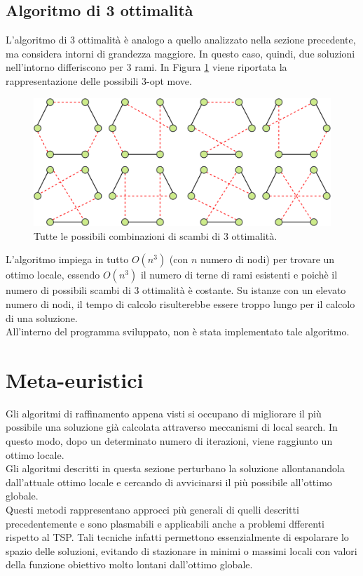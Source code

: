 \subsection{Algoritmo di 3 ottimalità}
L'algoritmo di 3 ottimalità è analogo a quello analizzato nella sezione precedente, ma considera intorni di grandezza maggiore. In questo caso, quindi, due soluzioni nell'intorno differiscono per 3 rami. In Figura \ref{three_optimality} viene riportata la rappresentazione delle possibili 3-opt move.
\begin{figure}[H] 
\begin{center} 
  \includegraphics[scale=0.35]{Images/3_swap}
  \caption{\footnotesize{Tutte le possibili combinazioni di scambi di 3 ottimalità.}}
  \label{three_optimality}
\end{center}
\end{figure}
L'algoritmo impiega in tutto $O(n^3)$ (con $n$ numero di nodi) per trovare un ottimo locale, essendo $O(n^3)$ il numero di terne di rami esistenti e poichè il numero di possibili scambi di 3 ottimalità è costante. Su istanze con un elevato numero di nodi, il tempo di calcolo risulterebbe essere troppo lungo per il calcolo di una soluzione.\\
All'interno del programma sviluppato, non è stata implementato tale algoritmo.

\section{Meta-euristici}
Gli algoritmi di raffinamento appena visti si occupano di migliorare il più possibile una soluzione già calcolata attraverso meccanismi di local search. In questo modo, dopo un determinato numero di iterazioni, viene raggiunto un ottimo locale.\\
Gli algoritmi descritti in questa sezione perturbano la soluzione allontanandola dall'attuale ottimo locale e cercando di avvicinarsi il più possibile all'ottimo globale.\\
Questi metodi rappresentano approcci più generali di quelli descritti precedentemente e sono plasmabili e applicabili anche a problemi dfferenti rispetto al TSP. Tali tecniche infatti permettono essenzialmente di espolarare lo spazio delle soluzioni, evitando di stazionare in minimi o massimi locali con valori della funzione obiettivo molto lontani dall'ottimo globale.

